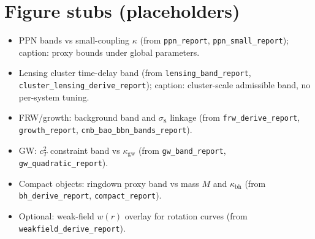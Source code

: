 \documentclass[11pt]{article}
\newcommand{\ctwo}{c_T^2}
\begin{document}
\section{Figure stubs (placeholders)}
\begin{itemize}
  \item PPN bands vs small-coupling $\kappa$ (from \texttt{ppn\_report}, \texttt{ppn\_small\_report}); caption: proxy bounds under global parameters.
  \item Lensing cluster time-delay band (from \texttt{lensing\_band\_report}, \texttt{cluster\_lensing\_derive\_report}); caption: cluster-scale admissible band, no per-system tuning.
  \item FRW/growth: background band and $\sigma_8$ linkage (from \texttt{frw\_derive\_report}, \texttt{growth\_report}, \texttt{cmb\_bao\_bbn\_bands\_report}).
  \item GW: $\ctwo$ constraint band vs $\kappa_{\mathrm{gw}}$ (from \texttt{gw\_band\_report}, \texttt{gw\_quadratic\_report}).
  \item Compact objects: ringdown proxy band vs mass $M$ and $\kappa_{\mathrm{bh}}$ (from \texttt{bh\_derive\_report}, \texttt{compact\_report}).
  \item Optional: weak-field $w(r)$ overlay for rotation curves (from \texttt{weakfield\_derive\_report}).
\end{itemize}

\appendix
\end{document}

